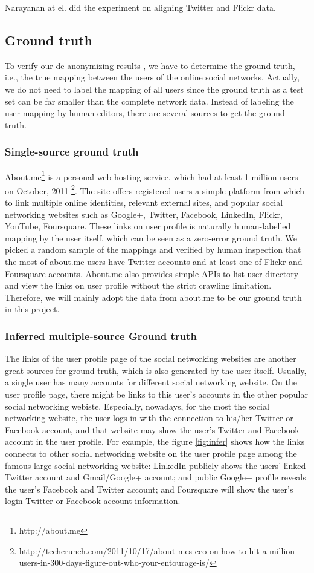 \documentclass[11pt,letterpaper]{article}
\begin{document}
Narayanan at el. \cite{Narayanan2008} did the experiment on aligning Twitter and Flickr data.

\subsection{Ground truth}
To verify our de-anonymizing results , we have to determine the ground truth, i.e., the true mapping between the users of the online social networks. Actually, we do not need to label the mapping of all users since the ground truth as a test set can be far smaller than the complete network data.
Instead of labeling the user mapping by human editors, there are several sources to get the ground truth. 

\subsubsection{Single-source ground truth}

About.me\footnote{http://about.me} is a personal web hosting service, which had at least 1 million users on October, 2011 \footnote{http://techcrunch.com/2011/10/17/about-mes-ceo-on-how-to-hit-a-million-users-in-300-days-figure-out-who-your-entourage-is/}. The site offers registered users a simple platform from which to link multiple online identities, relevant external sites, and popular social networking websites such as Google+, Twitter, Facebook, LinkedIn, Flickr, YouTube, Foursquare. These links on user profile is naturally human-labelled mapping by the user itself, which can be seen as a zero-error ground truth.  We picked a random sample of the mappings and verified by human inspection that the most of about.me users have Twitter accounts and at least one of Flickr and Foursquare accounts. About.me also provides simple APIs to list user directory and view the links on user profile without the strict crawling limitation. Therefore, we will mainly adopt the data from about.me to be our ground truth in this project.

\subsubsection{Inferred multiple-source Ground truth}

The links of the user profile page of the social networking websites are another great sources for ground truth, which is also generated by the user itself. Usually, a single user has many accounts for different social networking website. On the user profile page, there might be links to this user's accounts in the other popular social networking webiste. Especially, nowadays, for the most the social networking website, the user logs in with the connection to his/her Twitter or Facebook account, and that website may show the user's Twitter and Facebook account in the user profile. For example, the figure \ref{fig:infer} shows how the links connects to other social networking website on the user profile page among the famous large social networking website: LinkedIn publicly shows the users' linked Twitter account and Gmail/Google+ account; and public Google+ profile reveals the user's Facebook and Twitter account; and Foursquare will show the user's login Twitter or Facebook account information. 
\end{document}
